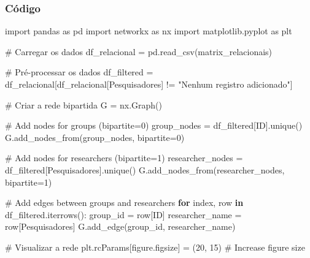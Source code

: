 \documentclass[
  brazilian,
  letterpaper,
  DIV=11,
  numbers=noendperiod]{scrartcl}
\newenvironment{Shaded}{\begin{snugshade}}{\end{snugshade}}
\newcommand{\CommentTok}[1]{\textcolor[rgb]{0.37,0.37,0.37}{#1}}
\newcommand{\ControlFlowTok}[1]{\textcolor[rgb]{0.00,0.23,0.31}{\textbf{#1}}}
\newcommand{\DecValTok}[1]{\textcolor[rgb]{0.68,0.00,0.00}{#1}}
\newcommand{\ImportTok}[1]{\textcolor[rgb]{0.00,0.46,0.62}{#1}}
\newcommand{\KeywordTok}[1]{\textcolor[rgb]{0.00,0.23,0.31}{\textbf{#1}}}
\newcommand{\NormalTok}[1]{\textcolor[rgb]{0.00,0.23,0.31}{#1}}
\newcommand{\OperatorTok}[1]{\textcolor[rgb]{0.37,0.37,0.37}{#1}}
\newcommand{\StringTok}[1]{\textcolor[rgb]{0.13,0.47,0.30}{#1}}
\begin{document}
\subsubsection{Código}\label{cuxf3digo-4}

\begin{Shaded}
\begin{Highlighting}[]
\ImportTok{import}\NormalTok{ pandas }\ImportTok{as}\NormalTok{ pd}
\ImportTok{import}\NormalTok{ networkx }\ImportTok{as}\NormalTok{ nx}
\ImportTok{import}\NormalTok{ matplotlib.pyplot }\ImportTok{as}\NormalTok{ plt}

\CommentTok{\# Carregar os dados}
\NormalTok{df\_relacional }\OperatorTok{=}\NormalTok{ pd.read\_csv(}\StringTok{\textquotesingle{}matrix\_relacionais\textquotesingle{}}\NormalTok{)}

\CommentTok{\# Pré{-}processar os dados}
\NormalTok{df\_filtered }\OperatorTok{=}\NormalTok{ df\_relacional[df\_relacional[}\StringTok{\textquotesingle{}Pesquisadores\textquotesingle{}}\NormalTok{] }\OperatorTok{!=} \StringTok{"Nenhum registro adicionado"}\NormalTok{]}

\CommentTok{\# Criar a rede bipartida}
\NormalTok{G }\OperatorTok{=}\NormalTok{ nx.Graph()}

\CommentTok{\# Add nodes for groups (bipartite=0)}
\NormalTok{group\_nodes }\OperatorTok{=}\NormalTok{ df\_filtered[}\StringTok{\textquotesingle{}ID\textquotesingle{}}\NormalTok{].unique()}
\NormalTok{G.add\_nodes\_from(group\_nodes, bipartite}\OperatorTok{=}\DecValTok{0}\NormalTok{)}

\CommentTok{\# Add nodes for researchers (bipartite=1)}
\NormalTok{researcher\_nodes }\OperatorTok{=}\NormalTok{ df\_filtered[}\StringTok{\textquotesingle{}Pesquisadores\textquotesingle{}}\NormalTok{].unique()}
\NormalTok{G.add\_nodes\_from(researcher\_nodes, bipartite}\OperatorTok{=}\DecValTok{1}\NormalTok{)}

\CommentTok{\# Add edges between groups and researchers}
\ControlFlowTok{for}\NormalTok{ index, row }\KeywordTok{in}\NormalTok{ df\_filtered.iterrows():}
\NormalTok{    group\_id }\OperatorTok{=}\NormalTok{ row[}\StringTok{\textquotesingle{}ID\textquotesingle{}}\NormalTok{]}
\NormalTok{    researcher\_name }\OperatorTok{=}\NormalTok{ row[}\StringTok{\textquotesingle{}Pesquisadores\textquotesingle{}}\NormalTok{]}
\NormalTok{    G.add\_edge(group\_id, researcher\_name)}

\CommentTok{\# Visualizar a rede}
\NormalTok{plt.rcParams[}\StringTok{\textquotesingle{}figure.figsize\textquotesingle{}}\NormalTok{] }\OperatorTok{=}\NormalTok{ (}\DecValTok{20}\NormalTok{, }\DecValTok{15}\NormalTok{) }\CommentTok{\# Increase figure size}


\end{Highlighting}
\end{Shaded}
\end{document}
